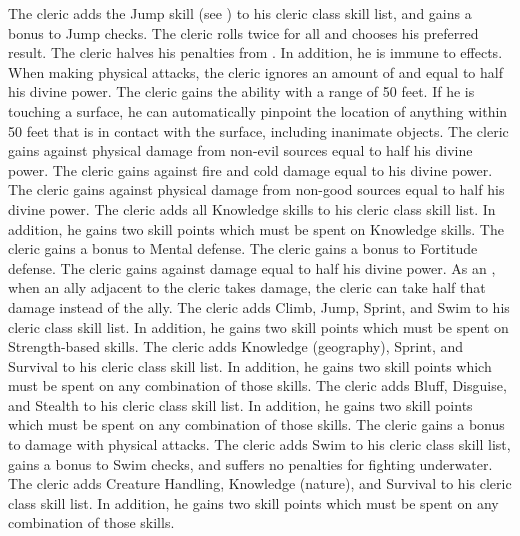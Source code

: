             The cleric adds the Jump skill (see ) to his cleric class skill list, and gains a  bonus to Jump checks.
            The cleric rolls twice for all  and chooses his preferred result.
            The cleric halves his penalties from .
            In addition, he is immune to  effects.
            When making physical attacks, the cleric ignores an amount of  and  equal to half his divine power.
            The cleric gains the  ability with a range of 50 feet.
            If he is touching a surface, he can automatically pinpoint the location of anything within 50 feet that is in contact with the surface, including inanimate objects.
            The cleric gains  against physical damage from non-evil sources equal to half his divine power.
            The cleric gains  against fire and cold damage equal to his divine power.
            The cleric gains  against physical damage from non-good sources equal to half his divine power.
            The cleric adds all Knowledge skills to his cleric class skill list.
            In addition, he gains two skill points which must be spent on Knowledge skills.
            The cleric gains a  bonus to Mental defense.
            The cleric gains a  bonus to Fortitude defense.
            The cleric gains  against  damage equal to half his divine power.
            As an , when an ally adjacent to the cleric takes damage, the cleric can take half that damage instead of the ally.
            The cleric adds Climb, Jump, Sprint, and Swim to his cleric class skill list.
            In addition, he gains two skill points which must be spent on Strength-based skills.
            The cleric adds Knowledge (geography), Sprint, and Survival to his cleric class skill list.
            In addition, he gains two skill points which must be spent on any combination of those skills.
            The cleric adds Bluff, Disguise, and Stealth to his cleric class skill list.
            In addition, he gains two skill points which must be spent on any combination of those skills.
            The cleric gains a  bonus to damage with physical attacks.
            The cleric adds Swim to his cleric class skill list, gains a  bonus to Swim checks, and suffers no penalties for fighting underwater.
            The cleric adds Creature Handling, Knowledge (nature), and Survival to his cleric class skill list.
            In addition, he gains two skill points which must be spent on any combination of those skills.

